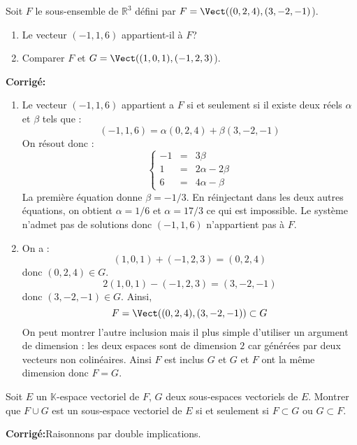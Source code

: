 \documentclass[a4paper,twoside,french,10pt]{VcCours}
\newcommand{\corr}{\textbf{Corrigé:}}
\begin{document}
\medskip



\begin{Exercice}{} Soit $F$ le sous-ensemble de $\mathbb{R}^3$ défini par $F=\Vect((0,2,4), (3,-2,-1)$).
\begin{enumerate}
\item Le vecteur $(-1,1,6)$ appartient-il à $F$?
\item Comparer $F$ et $G=\Vect((1,0,1), (-1,2,3)$).
\end{enumerate}
\end{Exercice}

\corr 
\begin{enumerate}
\item Le vecteur $(-1,1,6)$ appartient a $F$ si et seulement si il existe deux réels $\alpha$ et $\beta$ tels que :
$$ (-1,1,6) = \alpha (0,2,4) + \beta (3,-2,-1)$$
On résout donc :
$$ \left\lbrace \begin{array}{ccl}
-1 & = & 3 \beta \\
1 & = & 2 \alpha - 2 \beta \\
6 & = & 4 \alpha - \beta
\end{array}\right.$$
La première équation donne $\beta = -1/3$. En réinjectant dans les deux autres équations, on obtient $\alpha=1/6$ et $\alpha = 17/3$ ce qui est impossible. Le système n'admet pas de solutions donc $(-1,1,6)$ n'appartient pas à $F$.
\item On a :
$$ (1,0,1) + (-1,2,3) =(0,2,4)$$
donc $(0,2,4) \in G$.
$$ 2(1,0,1) -(-1,2,3) = (3,-2,-1)$$
donc $(3,-2,-1) \in G$. Ainsi,
$$ F=\Vect((0,2,4), (3,-2,-1)) \subset G$$
On peut montrer l'autre inclusion mais il plus simple d'utiliser un argument de dimension : les deux espaces sont de dimension $2$ car générées par deux vecteurs non colinéaires. Ainsi $F$ est inclus $G$ et $G$ et $F$ ont la même dimension donc $F=G$.
\end{enumerate}

\medskip

\begin{Exercice}{} Soit $E$ un $\mathbb{K}$-espace vectoriel de $F$, $G$ deux sous-espaces vectoriels de $E$. Montrer que $F \cup G$ est un sous-espace vectoriel de $E$ si et seulement si $F \subset G$ ou $G \subset F$.
\end{Exercice}

\corr Raisonnons par double implications.
\end{document}
